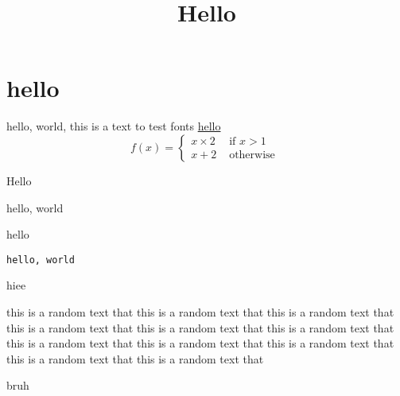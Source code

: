 \documentclass[11pt]{ahsan}
\title{Hello}
\begin{document}
\maketitle
\tableofcontents

\section{hello}

hello, world, this is a text to test fonts
\url{hello}
\[f(x) = \begin{cases}
    x \times 2 & \text{ if } x > 1\\
    x + 2 & \text{ otherwise }
\end{cases}\]

\begin{theorem}
    Hello
\end{theorem}
\begin{prooof}
    hello, world
\end{prooof}

\begin{lemma}
    hello

\end{lemma}

\begin{lstlisting}[style=myhaskell]
hello, world
\end{lstlisting}

\begin{lemma}
    hiee
\end{lemma}

\begin{lemma}
    this is a random text that 
    this is a random text that 
    this is a random text that 
    this is a random text that 
    this is a random text that 
    this is a random text that 
    this is a random text that 
    this is a random text that 
    this is a random text that 
    this is a random text that 
    this is a random text that 
\end{lemma}

\begin{scala}[hel]
bruh
\end{scala}
\end{document}
